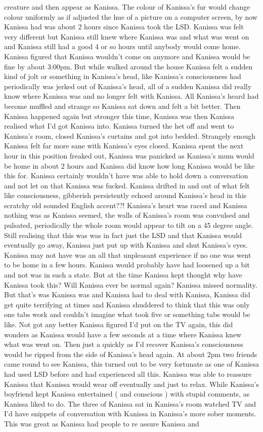 \documentclass[12pt]{book}
\begin{document}
creature and then appear as Kanissa. The colour of Kanissa's fur would change colour uniformly as if adjusted the hue of a picture on a computer screen, by now Kanissa had was about 2 hours since Kanissa took the LSD. Kanissa was felt very different but Kanissa still knew where Kanissa was and what was went on and Kanissa still had a good 4 or so hours until anybody would come home. Kanissa figured that Kanissa wouldn't come on anymore and Kanissa would be fine by about 3:00pm. But while walked around the house Kanissa felt a sudden kind of jolt or something in Kanissa's head, like Kanissa's consciousness had periodically was jerked out of Kanissa's head, all of a sudden Kanissa did really know where Kanissa was and no longer felt with Kanissa. All Kanissa's heard had become muffled and strange so Kanissa sat down and felt a bit better. Then Kanissa happened again but stronger this time, Kanissa was then Kanissa realised what I'd got Kanissa into. Kanissa turned the het off and went to Kanissa's room, closed Kanissa's curtains and got into bedded. Strangely enough Kanissa felt far more sane with Kanissa's eyes closed. Kanissa spent the next hour in this position freaked out, Kanissa was panicked as Kanissa's mum would be home in about 2 hours and Kanissa did know how long Kanissa would be like this for. Kanissa certainly wouldn't have was able to hold down a conversation and not let on that Kanissa was fucked. Kanissa drifted in and out of what felt like consciousness, gibberish persistently echoed around Kanissa's head in this scratchy old sounded English accent??! Kanissa's heart was raced and Kanissa nothing was as Kanissa seemed, the walls of Kanissa's room was convulsed and pulsated, periodically the whole room would appear to tilt on a 45 degree angle. Still realising that this was was in fact just the LSD and that Kanissa would eventually go away, Kanissa just put up with Kanissa and shut Kanissa's eyes. Kanissa may not have was an all that unpleasant experience if no one was went to be home in a few hours. Kanissa would probably have had loosened up a bit and not was in such a state. But at the time Kanissa kept thought why have Kanissa took this? Will Kanissa ever be normal again? Kanissa missed normality. But that's was Kanissa was and Kanissa had to deal with Kanissa, Kanissa did get quite terrifying at times and Kanissa shuddered to think that this was only one tabs work and couldn't imagine what took five or something tabs would be like. Not got any better Kanissa figured I'd put on the TV again, this did wonders as Kanissa would have a few seconds at a time where Kanissa knew what was went on. Then just a quickly as I'd recover Kanissa's consciousness would be ripped from the side of Kanissa's head again. At about 2pm two friends came round to see Kanissa, this turned out to be very fortunate as one of Kanissa had used LSD before and had experienced all this. Kanissa was able to reassure Kanissa that Kanissa would wear off eventually and just to relax. While Kanissa's boyfriend kept Kanissa entertained ( and conscious ) with stupid comments, as Kanissa liked to do. The three of Kanissa sat in Kanissa's room watched TV and I'd have snippets of conversation with Kanissa in Kanissa's more sober moments. This was great as Kanissa had people to re assure Kanissa and 
\end{document}
